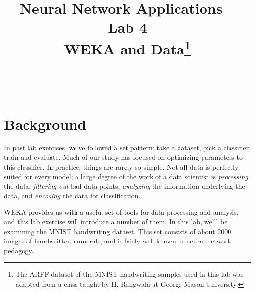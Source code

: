 \documentclass[11pt]{cselabheader}
\title{Neural Network Applications -- Lab 4 \\ WEKA and Data\footnote{The ARFF dataset of the MNIST handwriting samples used in this lab was adapted from a class taught by H. Rangwala at George Mason University.}}
\begin{document}
\maketitle

\horrule{0.5pt}\\\horrule{2pt}

\section{Background}



In past lab exercises, we've followed a set pattern: take a dataset, pick a classifier, train and evaluate. Much of our study has focused on optimizing parameters to this classifier. In practice, things are rarely so simple. Not all data is perfectly suited for every model; a large degree of the work of a data scientist is \emph{processing} the data, \emph{filtering out} bad data points, \emph{analyzing} the information underlying the data, and \emph{encoding} the data for classification.

WEKA provides us with a useful set of tools for data processing and analysis, and this lab exercise will introduce a number of them. In this lab, we'll be examining the MNIST handwriting dataset. This set consists of about 2000 images of handwritten numerals, and is fairly well-known in neural-network pedagogy.
\end{document}
